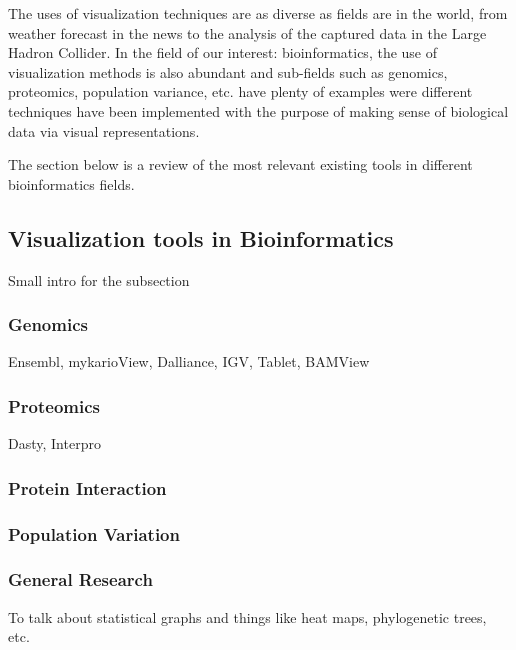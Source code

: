The uses of visualization techniques are as diverse as fields are in the world, from weather forecast in the news to the analysis of the captured data in the Large Hadron Collider. In the field of our interest: bioinformatics, the use of visualization methods is also abundant and sub-fields such as genomics, proteomics, population variance, etc. have plenty of examples were different techniques have been implemented with the purpose of making sense of biological data via visual representations.

The section below is a review of the most relevant existing tools in different bioinformatics fields.
\subsection{Visualization tools in Bioinformatics}
Small intro for the subsection
\subsubsection{Genomics}
Ensembl, mykarioView, Dalliance, IGV, Tablet, BAMView
\subsubsection{Proteomics}
Dasty, Interpro
\subsubsection{Protein Interaction}
\subsubsection{Population Variation}
\subsubsection{General Research}
To talk about statistical graphs and things like heat maps, phylogenetic trees, etc.


